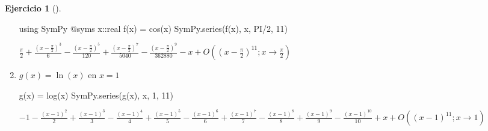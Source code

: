 \documentclass[
  a4paper,
]{scrreport}
\newenvironment{Shaded}{\begin{snugshade}}{\end{snugshade}}
\newcommand{\BuiltInTok}[1]{\textcolor[rgb]{0.00,0.23,0.31}{#1}}
\newcommand{\DataTypeTok}[1]{\textcolor[rgb]{0.68,0.00,0.00}{#1}}
\newcommand{\FloatTok}[1]{\textcolor[rgb]{0.68,0.00,0.00}{#1}}
\newcommand{\FunctionTok}[1]{\textcolor[rgb]{0.28,0.35,0.67}{#1}}
\newcommand{\ImportTok}[1]{\textcolor[rgb]{0.00,0.46,0.62}{#1}}
\newcommand{\NormalTok}[1]{\textcolor[rgb]{0.00,0.23,0.31}{#1}}
\newcommand{\OperatorTok}[1]{\textcolor[rgb]{0.37,0.37,0.37}{#1}}
\newcommand{\PreprocessorTok}[1]{\textcolor[rgb]{0.68,0.00,0.00}{#1}}
\theoremstyle{definition}
\newtheorem{exercise}{Ejercicio}[chapter]
\theoremstyle{remark}
\begin{document}
\begin{exercise}[]
\begin{enumerate}
\begin{tcolorbox}
\begin{Shaded}
\begin{Highlighting}[]
\ImportTok{using} \BuiltInTok{SymPy}
\PreprocessorTok{@syms}\NormalTok{ x}\OperatorTok{::}\DataTypeTok{real}
\FunctionTok{f}\NormalTok{(x) }\OperatorTok{=} \FunctionTok{cos}\NormalTok{(x)}
\NormalTok{SymPy.}\FunctionTok{series}\NormalTok{(}\FunctionTok{f}\NormalTok{(x), x, PI}\OperatorTok{/}\FloatTok{2}\NormalTok{, }\FloatTok{11}\NormalTok{)}
\end{Highlighting}
\end{Shaded}

  $\frac{\pi}{2} + \frac{\left(x - \frac{\pi}{2}\right)^{3}}{6} - \frac{\left(x - \frac{\pi}{2}\right)^{5}}{120} + \frac{\left(x - \frac{\pi}{2}\right)^{7}}{5040} - \frac{\left(x - \frac{\pi}{2}\right)^{9}}{362880} - x + O\left(\left(x - \frac{\pi}{2}\right)^{11}; x\rightarrow \frac{\pi}{2}\right)$

  \end{tcolorbox}
\item
  \(g(x)=\ln(x)\) en \(x=1\)

  \begin{tcolorbox}[enhanced jigsaw, opacitybacktitle=0.6, bottomrule=.15mm, opacityback=0, colback=white, left=2mm, coltitle=black, rightrule=.15mm, breakable, bottomtitle=1mm, leftrule=.75mm, title=\textcolor{quarto-callout-tip-color}{\faLightbulb}\hspace{0.5em}{Solución}, titlerule=0mm, toptitle=1mm, colbacktitle=quarto-callout-tip-color!10!white, colframe=quarto-callout-tip-color-frame, toprule=.15mm, arc=.35mm]

\begin{Shaded}
\begin{Highlighting}[]
\FunctionTok{g}\NormalTok{(x) }\OperatorTok{=} \FunctionTok{log}\NormalTok{(x)}
\NormalTok{SymPy.}\FunctionTok{series}\NormalTok{(}\FunctionTok{g}\NormalTok{(x), x, }\FloatTok{1}\NormalTok{, }\FloatTok{11}\NormalTok{)}
\end{Highlighting}
\end{Shaded}

  $-1 - \frac{\left(x - 1\right)^{2}}{2} + \frac{\left(x - 1\right)^{3}}{3} - \frac{\left(x - 1\right)^{4}}{4} + \frac{\left(x - 1\right)^{5}}{5} - \frac{\left(x - 1\right)^{6}}{6} + \frac{\left(x - 1\right)^{7}}{7} - \frac{\left(x - 1\right)^{8}}{8} + \frac{\left(x - 1\right)^{9}}{9} - \frac{\left(x - 1\right)^{10}}{10} + x + O\left(\left(x - 1\right)^{11}; x\rightarrow 1\right)$

  \end{tcolorbox}


\end{enumerate}
\end{exercise}
\end{document}
